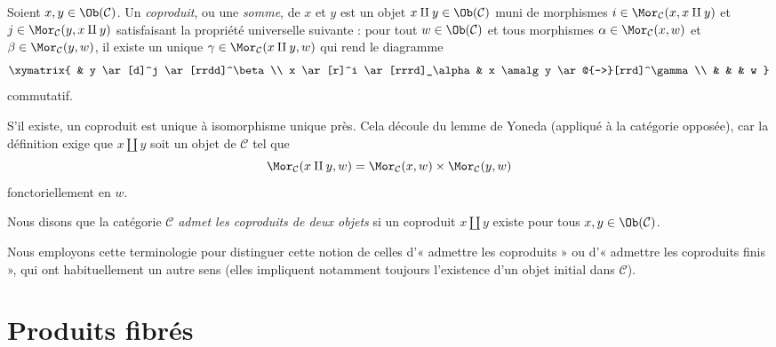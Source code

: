 \begin{definition}
\label{definition-coproducts}
Soient $x, y \in \Ob(\mathcal{C})$.
Un {\it coproduit}, ou une {\it somme}, de $x$ et $y$ est
un objet $x \amalg y \in \Ob(\mathcal{C})$
muni de morphismes
$i \in \Mor_{\mathcal C}(x, x \amalg y)$ et
$j \in \Mor_{\mathcal C}(y, x \amalg y)$
satisfaisant la propriété universelle suivante : pour tout
$w \in \Ob(\mathcal{C})$ et tous morphismes
$\alpha \in \Mor_{\mathcal C}(x, w)$ et
$\beta \in \Mor_\mathcal{C}(y, w)$,
il existe un unique
$\gamma \in \Mor_{\mathcal C}(x \amalg y, w)$ qui rend le diagramme
$$
\xymatrix{
& y \ar[d]^j \ar[rrdd]^\beta \\
x \ar[r]^i \ar[rrrd]_\alpha & x \amalg y \ar@{-->}[rrd]^\gamma \\
& & & w
}
$$
commutatif.
\end{definition}

\noindent
S'il existe, un coproduit est unique à isomorphisme unique près.
Cela découle du lemme de Yoneda (appliqué à la catégorie opposée),
car la définition exige que $x \amalg y$ soit un objet
de $\mathcal{C}$ tel que
$$
\Mor_\mathcal{C}(x \amalg y, w) =
\Mor_\mathcal{C}(x, w) \times \Mor_\mathcal{C}(y, w)
$$
fonctoriellement en $w$.

\begin{definition}
\label{definition-has-coproducts-of-pairs}
Nous disons que la catégorie $\mathcal{C}$ {\it admet les coproduits de deux
objets} si un coproduit $x \amalg y$ existe pour tous
$x, y \in \Ob(\mathcal{C})$.
\end{definition}

\noindent
Nous employons cette terminologie pour distinguer cette notion de celles
d'« admettre les coproduits » ou d'« admettre les coproduits finis », qui ont
habituellement un autre sens (elles impliquent notamment toujours l'existence
d'un objet initial dans $\mathcal{C}$).





\section{Produits fibrés}
\label{section-fibre-products}

